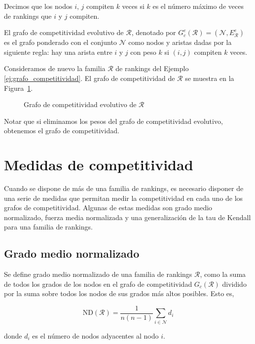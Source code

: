 \begin{defi}
Decimos que los nodos $i$, $j$ compiten $k$ veces si $k$ es el número máximo de veces de rankings que $i$ y $j$ compiten.
\end{defi}

\begin{defi}
El grafo de competitividad evolutivo de $\mathcal{R}$, denotado por $G_c^e(\mathcal{R}) = (\mathcal{N}, E_\mathcal{R}^e)$ es el grafo ponderado con el conjunto $\mathcal{N}$ como nodos y aristas dadas por la siguiente regla: hay una arista entre $i$ y $j$ con peso $k$ si $(i,j)$ compiten $k$ veces.
\end{defi}

\begin{ejemplo}
Consideramos de nuevo la familia $\mathcal{R}$ de rankings del Ejemplo \ref{ej:grafo_competitividad}. El grafo de competitividad de $\mathcal{R}$ se muestra en la Figura~\ref{fig:grafo_competitividad_evolutivo}.

\begin{figure}[htb]
\centering
\ejemplografocompetitividadevolutivo
\caption[Grafo de competitividad evolutivo]{Grafo de competitividad evolutivo de $\mathcal{R}$}
\label{fig:grafo_competitividad_evolutivo}
\end{figure}

\end{ejemplo}

Notar que si eliminamos los pesos del grafo de competitividad evolutivo, obtenemos el grafo de competitividad.

\section{Medidas de competitividad}

Cuando se dispone de más de una familia de rankings, es necesario disponer de una serie de medidas que permitan medir la competitividad en cada uno de los grafos de competitividad. Algunas de estas medidas son grado medio normalizado, fuerza media normalizada y una generalización de la tau de Kendall para una familia de rankings.

\subsection*{Grado medio normalizado}

\begin{defi}
Se define grado medio normalizado de una familia de rankings $\mathcal{R}$, como la suma de todos los grados de los nodos en el grafo de competitividad $G_c(\mathcal{R})$ dividido por la suma sobre todos los nodos de sus grados más altos posibles. Esto es,

\begin{equation}
\mathrm{ND}(\mathcal{R}) = \dfrac{1}{n(n-1)} \sum_{i \in \mathcal{N}} d_i
\end{equation}

donde $d_i$ es el número de nodos adyacentes al nodo  $i$.
\end{defi}

